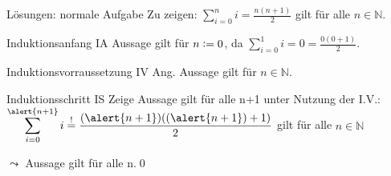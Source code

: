 {\begin{frame}[fragile]{Lösungen: normale Aufgabe}
    Zu zeigen: $\displaystyle\sum_{i=0}^{n} i = \frac{n(n+1)}{2}$ gilt für alle $n \in \mathbb{N}$.
    \begin{alertblock}{Induktionsanfang IA}
        Aussage gilt für $n\vcentcolon= 0$, da $\displaystyle\sum_{i=0}^{1} i = 0 = \frac{0(0+1)}{2}$.
    \end{alertblock}
    \begin{alertblock}{Induktionsvorraussetzung IV}
        Ang. Aussage gilt für $n \in\mathbb{N}$.
    \end{alertblock}
    \begin{alertblock}{Induktionsschritt IS}
        Zeige Aussage gilt für alle n+1 unter Nutzung der I.V.:\\
        $\displaystyle\sum_{i=0}^{\alert{n+1}} i \overset{!}{=} \frac{(\alert{n+1})((\alert{n+1})+1)}{2}$ gilt für alle $n \in \mathbb{N}$
    \end{alertblock}
    \alert{$\leadsto$ Aussage gilt für alle n.}\qed
\end{frame}
}


